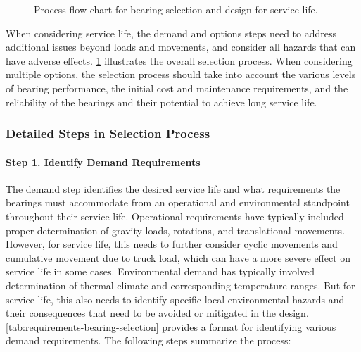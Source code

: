 \begin{figure}
  \caption{Process flow chart for bearing selection and design for service life.}
  \label{fig:flow-chart-bearing-selection}
\end{figure}

When considering service life, the demand and options steps need to address additional issues beyond loads and movements, and consider all hazards that can have adverse effects. \cref{fig:flow-chart-bearing-selection} illustrates the overall selection process. When considering multiple options, the selection process should take into account the various levels of bearing performance, the initial cost and maintenance requirements, and the reliability of the bearings and their potential to achieve long service life.



\subsubsection{Detailed Steps in Selection Process}

\paragraph*{Step 1. Identify Demand Requirements}
The demand step identifies the desired service life and what requirements the bearings must accommodate from an operational and environmental standpoint throughout their service life. Operational requirements have typically included proper determination of gravity loads, rotations, and translational movements. However, for service life, this needs to further consider cyclic movements and cumulative movement due to truck load, which can have a more severe effect on service life in some cases. Environmental demand has typically involved determination of thermal climate and corresponding temperature ranges. But for service life, this also needs to identify specific local environmental hazards and their consequences that need to be avoided or mitigated in the design. \cref{tab:requirements-bearing-selection} provides a format for identifying various demand requirements. The following steps summarize the process:

